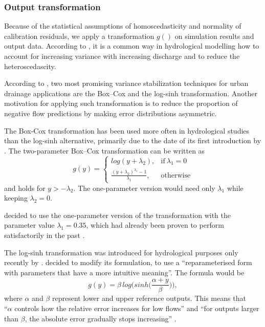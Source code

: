 \documentclass{ctuthesis}\usepackage[]{graphicx}\usepackage[]{color}
\begin{document}
\subsubsection{Output transformation} \label{transfTheor}

Because of the  statistical assumptions of homoscedasticity and normality of calibration residuals, we apply a transformation $g()$ on simulation results and output data.  According to  \cite{giudice2013improving}, it is a common way in hydrological modelling how to account for increasing variance with increasing discharge and to reduce the heteroscedascity.

According to \cite{giudice2013improving},  two most promising variance stabilization techniques for urban drainage
applications are the Box–Cox \citep{box1964analysis}  and the log-sinh \citep{wang2012log} transformation. Another motivation for applying such transformation is to reduce the proportion of negative flow predictions by making error distributions asymmetric.

The Box-Cox transformation has been used more often in hydrological studies \\ \citep{giudice2013improving} than the log-sinh alternative, primarily due to the date of its first introduction by \cite{box1964analysis}. The two-parameter Box–Cox transformation can be written as
\begin{equation}
 g(y)=
    \begin{cases}
      log(y+\lambda_2) , & \text{if}\ \lambda_1=0 \\
      \frac{(y+\lambda_2)^{\lambda_1}-1}{\lambda_1} , & \text{otherwise}
    \end{cases}
\end{equation}
and holds for $y > -\lambda_2$. The one-parameter version would need only  $\lambda_1$  while keeping $\lambda_2 = 0$.

\cite{giudice2013improving} decided to use the one-parameter version of the transformation with the parameter value $\lambda_1=0.35$, which had already been proven to perform satisfactorily in the past \citep[e.g.][]{honti2013integrated, wang2012log}.


The log-sinh transformation was introduced for hydrological purposes only recently by \cite{wang2012log}. \cite{giudice2013improving}  decided to modify its formulation, to use a \enquote{reparameterised form with parameters that have a more intuitive meaning}. The formula would be
\begin{equation}
g(y)= \beta \, log \Big(sinh \big( \frac{\alpha+y}{\beta} \big) \Big),
\end{equation}
where $\alpha$ and $\beta$ represent lower and upper reference outputs. This means that \\ \enquote{$\alpha$ controls how the relative error increases for low flows} and \enquote{for outputs larger than $\beta$, the absolute error gradually stops increasing} \citep{giudice2013improving}.
\end{document}
